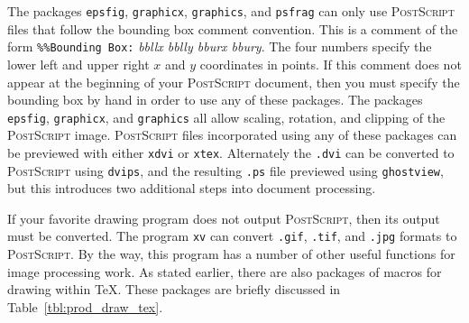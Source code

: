 \documentclass[11pt,titlepage]{article}
\begin{document}
The packages \texttt{epsfig}, \texttt{graphicx}, \texttt{graphics}, and
\texttt{psfrag} can only use \textsc{PostScript} files that follow the
bounding box comment convention.  This is a comment of the form
\texttt{\%\%Bounding Box:}\textit{ bbllx bblly bburx bbury}.  The four numbers
specify the lower left and upper right $x$ and $y$ coordinates in points.  If
this comment does not appear at the beginning of your \textsc{PostScript}
document, then you must specify the bounding box by hand in order to use any
of these packages.  The packages \texttt{epsfig}, \texttt{graphicx}, and
\texttt{graphics} all allow scaling, rotation, and clipping of the
\textsc{PostScript} image.  \textsc{PostScript} files incorporated using any
of these packages can be previewed with either \texttt{xdvi} or \texttt{xtex}.
Alternately the \texttt{.dvi} can be converted to \textsc{PostScript} using
\texttt{dvips}, and the resulting \texttt{.ps} file previewed using
\texttt{ghostview}, but this introduces two additional steps into document
processing.  
\addtocounter{footnote}{-1}%
%
\addtocounter{footnote}{1}%
%
%
If your favorite drawing program does not output \textsc{PostScript}, then its
output must be converted.  The program \texttt{xv} can convert \texttt{.gif},
\texttt{.tif}, and \texttt{.jpg} formats to \textsc{PostScript}.  By the way,
this program has a number of other useful functions for image processing work.
As stated earlier, there are also packages of macros for drawing within \TeX .
These packages are briefly discussed in Table~\ref{tbl:prod_draw_tex}.
%
\end{document}
